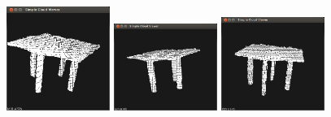 \begin{figure}[htb]
\begin{center}
	\includegraphics[width=0.30\textwidth]{figures/mesa2_1.png}
	\includegraphics[width=0.30\textwidth]{figures/mesa2_2.png}
	\includegraphics[width=0.30\textwidth]{figures/mesa2_3.png}
	\label{fig:mesa2_ensaios}
\end{center}
\end{figure}


